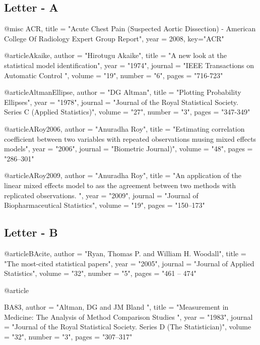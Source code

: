 

\subsection*{Letter - A}

@misc {ACR,
	title = "Acute {C}hest {P}ain (Suspected Aortic Dissection) - {A}merican {C}ollege Of {R}adiology {E}xpert {G}roup {R}eport",
	year = 2008,
	key="ACR"
}


@article{Akaike,	
	author = "Hirotugu Akaike",
	title = "A new look at the statistical model identification",
	year = "1974",
	journal = "IEEE Transactions on Automatic Control ",
	volume = "19",
	number = "6",
	pages = "716-723"
}


@article{AltmanEllipse,
	author = "DG Altman",
	title = "Plotting Probability Ellipses",
	year = "1978",
	journal = "Journal of the Royal Statistical Society. Series C (Applied Statistics)",
	volume = "27",
	number = "3",
	pages = "347-349"
}



@article{ARoy2006,
	author = "Anuradha Roy",
	title = "Estimating correlation coefficient between two variables with repeated observations musing mixed effects models",
	year = "2006",
	journal = "Biometric Journal)",
	volume = "48",
	pages = "286--301"
}



@article{ARoy2009,
	author = "Anuradha Roy",
	title = "An application of the linear mixed effects model to ass the agreement between two methods with replicated observations. ",
	year = "2009",
	journal = "Journal of Biopharmaceutical Statistics",
	volume = "19",
	pages = "150--173"
}

\subsection*{Letter - B}


@article{BAcite,
	author = "Ryan, Thomas P. and  William H. Woodall",
	title = "The most-cited statistical papers",
	year = "2005",
	journal = "Journal of Applied Statistics",
	volume = "32",
	number = "5",
	pages = "461 -- 474"
}

@article{BA83,
	author = "Altman, DG and JM Bland ",
	title = "Measurement in Medicine: The Analysis of Method Comparison Studies ",
	year = "1983",
	journal = "Journal of the Royal Statistical Society. Series D (The Statistician)",
	volume = "32",
	number = "3",
	pages = "307--317"
	
}


